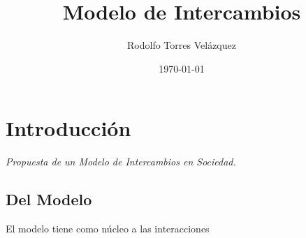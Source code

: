 \documentclass[]{book}
\title{\bf Modelo de Intercambios}
\author{Rodolfo Torres Velázquez}
\date{\today}
\begin{document}
\frontmatter
\maketitle
\tableofcontents
\mainmatter
\chapter{Introducción}
\begin{center}
\textit{Propuesta de un Modelo de Intercambios en Sociedad.}
\end{center}
\section{Del Modelo}
El modelo tiene como núcleo a las interacciones
\end{document}

